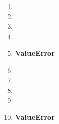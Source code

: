 \begin{multicols}{3}
\begin{enumerate}
    \item {}
    \item {}
    \item {}
    \item {}
    \item \textbf{ValueError}
    \item {}
    \item {}
    \item {}
    \item {}
    \item \textbf{ValueError}
\end{enumerate}
\end{multicols}
